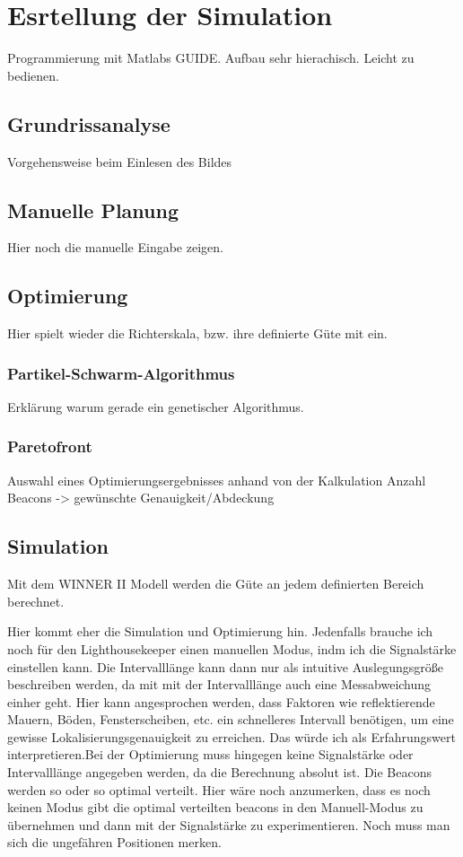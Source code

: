 \section{Esrtellung der Simulation}
Programmierung mit Matlabs GUIDE. Aufbau sehr hierachisch. Leicht zu bedienen. 
\subsection{Grundrissanalyse}
Vorgehensweise beim Einlesen des Bildes
\subsection{Manuelle Planung}
Hier noch die manuelle Eingabe zeigen.
\subsection{Optimierung}
Hier spielt wieder die Richterskala, bzw. ihre definierte Güte mit ein.
\subsubsection{Partikel-Schwarm-Algorithmus}
Erklärung warum gerade ein genetischer Algorithmus. 
\subsubsection{Paretofront}
Auswahl eines Optimierungsergebnisses anhand von der Kalkulation Anzahl Beacons -> gewünschte Genauigkeit/Abdeckung
\subsection{Simulation}
Mit dem WINNER II Modell werden die Güte an jedem definierten Bereich berechnet.


Hier kommt eher die Simulation und Optimierung hin. Jedenfalls brauche ich noch für den Lighthousekeeper einen manuellen Modus, indm ich die Signalstärke einstellen kann. Die Intervalllänge kann dann nur als intuitive Auslegungsgröße beschreiben werden, da mit mit der Intervalllänge auch eine Messabweichung einher geht. Hier kann angesprochen werden, dass Faktoren wie reflektierende Mauern, Böden, Fensterscheiben, etc. ein schnelleres Intervall benötigen, um eine gewisse Lokalisierungsgenauigkeit zu erreichen. Das würde ich als Erfahrungswert interpretieren.Bei der Optimierung muss hingegen keine Signalstärke oder Intervalllänge angegeben werden, da die Berechnung absolut ist. Die Beacons werden so oder so optimal verteilt. Hier wäre noch anzumerken, dass es noch keinen Modus gibt die optimal verteilten beacons in den Manuell-Modus zu übernehmen und dann mit der Signalstärke zu experimentieren. Noch muss man sich die ungefähren Positionen merken.



